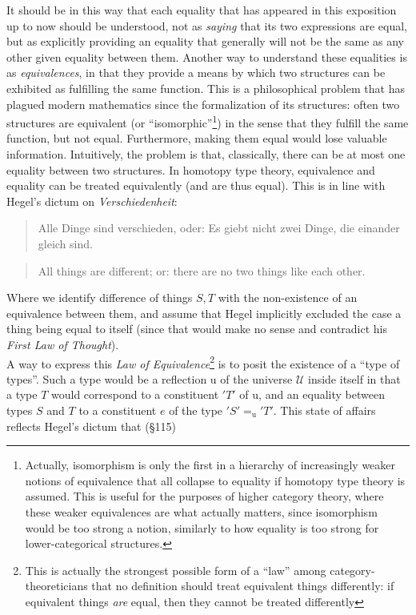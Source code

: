 \documentclass{article}
\begin{document}
It should be in this way that each equality that has appeared in this exposition up to now should be understood,
not as \emph{saying} that its two expressions are equal, but as explicitly providing an equality that
generally will not be the same as any other given equality between them. Another way to understand these
equalities is as \emph{equivalences}, in that they provide a means by which two structures can be exhibited
as fulfilling the same function. This is a philosophical problem that has plagued modern mathematics since
the formalization of its structures: often two structures are equivalent (or ``isomorphic''\footnote{Actually,
isomorphism is only the first in a hierarchy of increasingly weaker notions of equivalence that all collapse
to equality if homotopy type theory is assumed. This is useful for the purposes of higher category theory,
where these weaker equivalences are what actually matters, since isomorphism would be too strong a notion,
similarly to how equality is too strong for lower-categorical structures.}) in the sense that they fulfill
the same function, but not equal. Furthermore, making them equal would lose valuable information. Intuitively,
the problem is that, classically, there can be at most one equality between two structures. In homotopy
type theory, equivalence and equality can be treated equivalently (and are thus equal). This is in line
with Hegel's dictum on \emph{Verschiedenheit}:

\begin{quote}
   Alle Dinge sind verschieden, oder: Es giebt nicht zwei Dinge, die einander gleich sind.
\end{quote}

\begin{quote}
    All things are different; or: there are no two things like each other.
\end{quote}

Where we identify difference of things $S,T$ with the non-existence of an equivalence between them, and
assume that Hegel implicitly excluded the case a thing being equal to itself (since that would make no
sense and contradict his \emph{First Law of Thought}). \\

A way to express this \emph{Law of Equivalence}\footnote{This is actually the strongest possible form
of a ``law'' among category-theoreticians that no definition should treat equivalent things differently:
if equivalent things \emph{are} equal, then they cannot be treated differently} is to posit the existence
of a ``type of types''. Such a type would be a reflection $\mathrm{u}$ of the universe $\mathcal{U}$ inside
itself in that a type $T$ would correspond to a constituent $'T'$ of $\mathrm{u}$, and an equality between
types $S$ and $T$ to a constituent $e$ of the type $'S'=_{\mathrm{u}} 'T'$. This state of affairs reflects
Hegel's dictum that (§115)
\end{document}
